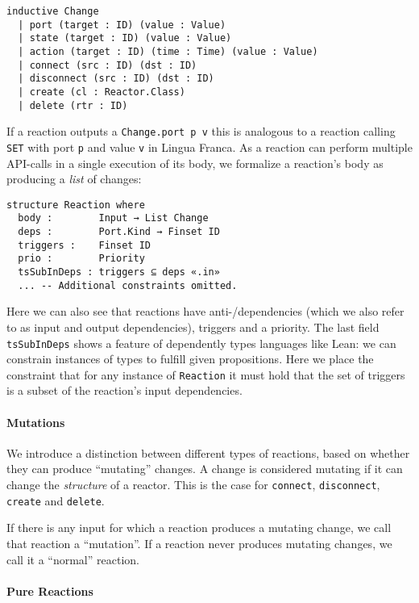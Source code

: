 \begin{lstlisting}
inductive Change
  | port (target : ID) (value : Value)
  | state (target : ID) (value : Value)
  | action (target : ID) (time : Time) (value : Value)
  | connect (src : ID) (dst : ID)
  | disconnect (src : ID) (dst : ID)
  | create (cl : Reactor.Class)
  | delete (rtr : ID)
\end{lstlisting}

If a reaction outputs a \lstinline{Change.port p v} this is analogous to a reaction calling \verb|SET| with port \verb|p| and value \verb|v| in Lingua Franca.
As a reaction can perform multiple API-calls in a single execution of its body, we formalize a reaction's body as producing a \emph{list} of changes:

\begin{lstlisting}
structure Reaction where
  body :        Input → List Change
  deps :        Port.Kind → Finset ID
  triggers :    Finset ID
  prio :        Priority
  tsSubInDeps : triggers ⊆ deps «.in»
  ... -- Additional constraints omitted.
\end{lstlisting}

Here we can also see that reactions have anti-/dependencies (which we also refer to as input and output dependencies), triggers and a priority.
The last field \lstinline{tsSubInDeps} shows a feature of dependently types languages like Lean: we can constrain instances of types to fulfill given propositions.
Here we place the constraint that for any instance of \lstinline{Reaction} it must hold that the set of triggers is a subset of the reaction's input dependencies.

\paragraph{Mutations}

We introduce a distinction between different types of reactions, based on whether they can produce ``mutating'' changes.
A change is considered mutating if it can change the \emph{structure} of a reactor.
This is the case for \lstinline{connect}, \lstinline{disconnect}, \lstinline{create} and \lstinline{delete}.

If there is any input for which a reaction produces a mutating change, we call that reaction a ``mutation''.
If a reaction never produces mutating changes, we call it a ``normal'' reaction.

\paragraph{Pure Reactions}

